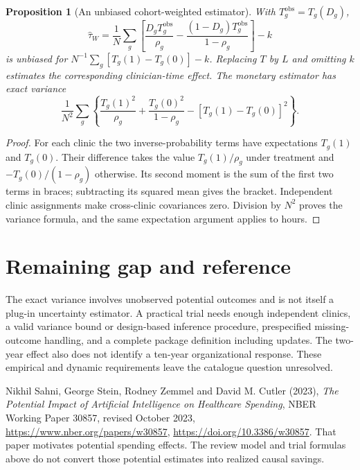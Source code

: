 \documentclass[11pt,a4paper]{article}
\newtheorem{proposition}[theorem]{Proposition}
\theoremstyle{definition}
\theoremstyle{remark}
\begin{document}
\begin{proposition}[An unbiased cohort-weighted estimator]
With $T_g^{\mathrm{obs}}=T_g(D_g)$,
\[
 \widehat\tau_W=\frac1N\sum_g\left[\frac{D_gT_g^{\mathrm{obs}}}{\rho_g}
 -\frac{(1-D_g)T_g^{\mathrm{obs}}}{1-\rho_g}\right]-k
\]
is unbiased for $N^{-1}\sum_g[T_g(1)-T_g(0)]-k$. Replacing $T$ by $L$ and omitting $k$ estimates the corresponding clinician-time effect. The monetary estimator has exact variance
\[
 \frac1{N^2}\sum_g\left\{\frac{T_g(1)^2}{\rho_g}
 +\frac{T_g(0)^2}{1-\rho_g}-[T_g(1)-T_g(0)]^2\right\}.
\]
\end{proposition}
\begin{proof}
For each clinic the two inverse-probability terms have expectations $T_g(1)$ and $T_g(0)$. Their difference takes the value $T_g(1)/\rho_g$ under treatment and $-T_g(0)/(1-\rho_g)$ otherwise. Its second moment is the sum of the first two terms in braces; subtracting its squared mean gives the bracket. Independent clinic assignments make cross-clinic covariances zero. Division by $N^2$ proves the variance formula, and the same expectation argument applies to hours.
\end{proof}

\section{Remaining gap and reference}
The exact variance involves unobserved potential outcomes and is not itself a plug-in uncertainty estimator. A practical trial needs enough independent clinics, a valid variance bound or design-based inference procedure, prespecified missing-outcome handling, and a complete package definition including updates. The two-year effect also does not identify a ten-year organizational response. These empirical and dynamic requirements leave the catalogue question unresolved.

Nikhil Sahni, George Stein, Rodney Zemmel and David M. Cutler (2023), \emph{The Potential Impact of Artificial Intelligence on Healthcare Spending}, NBER Working Paper 30857, revised October 2023, \url{https://www.nber.org/papers/w30857}, \url{https://doi.org/10.3386/w30857}. That paper motivates potential spending effects. The review model and trial formulas above do not convert those potential estimates into realized causal savings.
\end{document}
